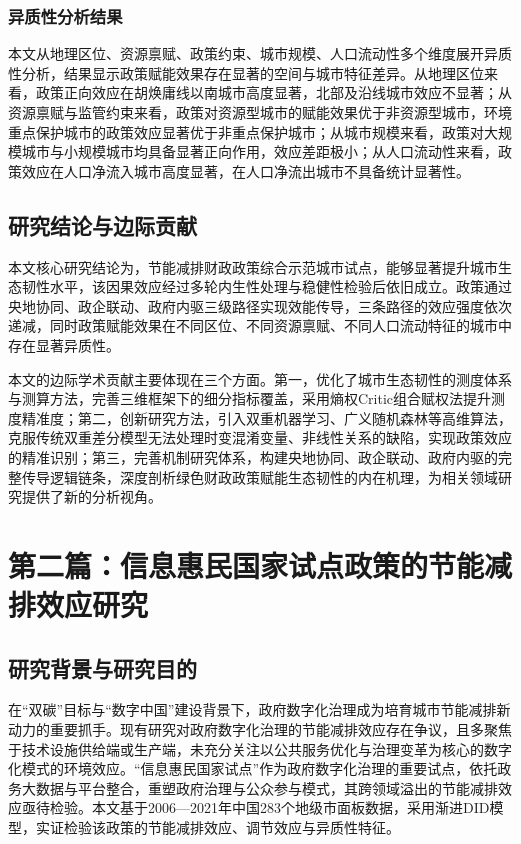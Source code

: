 \documentclass[lang=cn,a4paper,11pt]{elegantpaper}
\begin{document}
\subsubsection{异质性分析结果}
本文从地理区位、资源禀赋、政策约束、城市规模、人口流动性多个维度展开异质性分析，结果显示政策赋能效果存在显著的空间与城市特征差异。从地理区位来看，政策正向效应在胡焕庸线以南城市高度显著，北部及沿线城市效应不显著；从资源禀赋与监管约束来看，政策对资源型城市的赋能效果优于非资源型城市，环境重点保护城市的政策效应显著优于非重点保护城市；从城市规模来看，政策对大规模城市与小规模城市均具备显著正向作用，效应差距极小；从人口流动性来看，政策效应在人口净流入城市高度显著，在人口净流出城市不具备统计显著性。

\subsection{研究结论与边际贡献}
本文核心研究结论为，节能减排财政政策综合示范城市试点，能够显著提升城市生态韧性水平，该因果效应经过多轮内生性处理与稳健性检验后依旧成立。政策通过央地协同、政企联动、政府内驱三级路径实现效能传导，三条路径的效应强度依次递减，同时政策赋能效果在不同区位、不同资源禀赋、不同人口流动特征的城市中存在显著异质性。

本文的边际学术贡献主要体现在三个方面。第一，优化了城市生态韧性的测度体系与测算方法，完善三维框架下的细分指标覆盖，采用熵权\-Critic组合赋权法提升测度精准度；第二，创新研究方法，引入双重机器学习、广义随机森林等高维算法，克服传统双重差分模型无法处理时变混淆变量、非线性关系的缺陷，实现政策效应的精准识别；第三，完善机制研究体系，构建央地协同、政企联动、政府内驱的完整传导逻辑链条，深度剖析绿色财政政策赋能生态韧性的内在机理，为相关领域研究提供了新的分析视角。


\section{第二篇：信息惠民国家试点政策的节能减排效应研究}
\subsection{研究背景与研究目的}
在“双碳”目标与“数字中国”建设背景下，政府数字化治理成为培育城市节能减排新动力的重要抓手。现有研究对政府数字化治理的节能减排效应存在争议，且多聚焦于技术设施供给端或生产端，未充分关注以公共服务优化与治理变革为核心的数字化模式的环境效应。“信息惠民国家试点”作为政府数字化治理的重要试点，依托政务大数据与平台整合，重塑政府治理与公众参与模式，其跨领域溢出的节能减排效应亟待检验。本文基于2006—2021年中国283个地级市面板数据，采用渐进DID模型，实证检验该政策的节能减排效应、调节效应与异质性特征。
\end{document}

